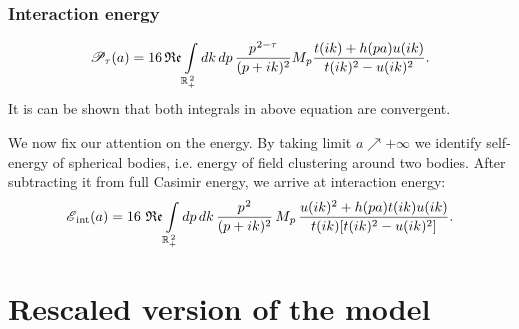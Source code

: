 \documentclass[10pt,t]{beamer}
\begin{document}
\begin{frame}
  \frametitle{Interaction energy}

  \vspace{-1em}


  \begin{equation}
    \label{eq:Scalar-field-and-two-quasi-deltas-10}
    \mathcal{P}_{ \tau }( a ) =
    16 \operatorname{\mathfrak{Re}} \int\limits_{ \mathbb{R}_{ + }^{ \, 2 } } dk \, dp \,
    \frac{ p^{ \hspace{0.05em} 2 - \tau } }{ ( p + i k )^{ 2 } } M_{ \hspace{0.05em} p }
    \frac{ t( i k ) + h( p a ) u( i k ) }{ t( i k )^{ 2 } - u( i k )^{ 2 } }.
  \end{equation}
  It is can be shown that both integrals in above equation are convergent.

  We now fix our attention on the energy. By taking limit $a \nearrow +\infty$
  we identify self-energy of spherical bodies, i.e. energy of field
  clustering around two bodies. After subtracting it from full Casimir
  energy, we arrive at interaction energy:
  \begin{equation}
    \label{eq:Scalar-field-and-two-quasi-deltas-11}
    \mathcal{E}_{ \, \textrm{int}}( a ) =
    16 \, \operatorname{\mathfrak{Re}} \int\limits_{ \mathbb{R}_{ + }^{ \, 2 } } dp \, dk \,
    \frac{ p^{ \hspace{0.05em} 2 } }{ ( p + i k )^{ 2 } } \, M_{ \hspace{0.05em} p } \,
    \frac{ u( i k )^{ 2 } + h( p a ) t( i k ) u( i k ) }{
      t( i k ) [ t( i k )^{ 2 } - u( i k )^{ 2 } ] }.
  \end{equation}

\end{frame}










\section{Rescaled version of the model}
\end{document}
